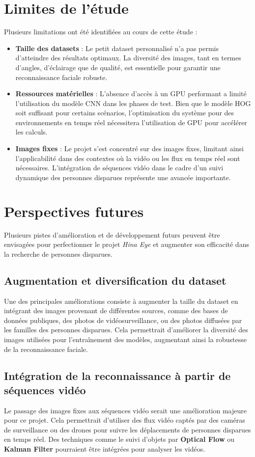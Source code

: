 \documentclass[a4paper,12pt]{report}
\begin{document}
\section{Limites de l'étude}
Plusieurs limitations ont été identifiées au cours de cette étude :
\begin{itemize}
    \item \textbf{Taille des datasets} : Le petit dataset personnalisé n'a pas permis d’atteindre des résultats optimaux. La diversité des images, tant en termes d'angles, d'éclairage que de qualité, est essentielle pour garantir une reconnaissance faciale robuste.
    \item \textbf{Ressources matérielles} : L'absence d'accès à un GPU performant a limité l’utilisation du modèle CNN dans les phases de test. Bien que le modèle HOG soit suffisant pour certains scénarios, l’optimisation du système pour des environnements en temps réel nécessitera l’utilisation de GPU pour accélérer les calculs.
    \item \textbf{Images fixes} : Le projet s’est concentré sur des images fixes, limitant ainsi l’applicabilité dans des contextes où la vidéo ou les flux en temps réel sont nécessaires. L'intégration de séquences vidéo dans le cadre d'un suivi dynamique des personnes disparues représente une avancée importante.
\end{itemize}

\section{Perspectives futures}
Plusieurs pistes d'amélioration et de développement futurs peuvent être envisagées pour perfectionner le projet \textit{Hina Eye} et augmenter son efficacité dans la recherche de personnes disparues.

\subsection{Augmentation et diversification du dataset}
Une des principales améliorations consiste à augmenter la taille du dataset en intégrant des images provenant de différentes sources, comme des bases de données publiques, des photos de vidéosurveillance, ou des photos diffusées par les familles des personnes disparues. Cela permettrait d'améliorer la diversité des images utilisées pour l'entraînement des modèles, augmentant ainsi la robustesse de la reconnaissance faciale.

\subsection{Intégration de la reconnaissance à partir de séquences vidéo}
Le passage des images fixes aux séquences vidéo serait une amélioration majeure pour ce projet. Cela permettrait d'utiliser des flux vidéo captés par des caméras de surveillance ou des drones pour suivre les déplacements de personnes disparues en temps réel. Des techniques comme le suivi d'objets par \textbf{Optical Flow} ou \textbf{Kalman Filter} pourraient être intégrées pour analyser les vidéos.
\end{document}
